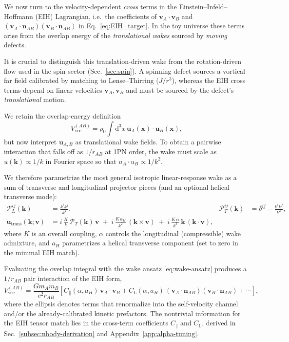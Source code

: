\documentclass[11pt]{article}
\newcommand{\dd}{\mathrm{d}}
\begin{document}
We now turn to the velocity-dependent \emph{cross} terms in the
Einstein--Infeld--Hoffmann (EIH) Lagrangian, i.e.\ the coefficients of
$\mathbf{v}_A\!\cdot\!\mathbf{v}_B$ and
$(\mathbf{v}_A\!\cdot\!\mathbf{n}_{AB})(\mathbf{v}_B\!\cdot\!\mathbf{n}_{AB})$
in Eq.~\eqref{eq:EIH_target}.
In the toy universe these terms arise from the overlap energy of the
\emph{translational wakes} sourced by \emph{moving} defects.

It is crucial to distinguish this translation-driven wake from the
rotation-driven flow used in the spin sector (Sec.~\ref{sec:spin}).
A spinning defect sources a vortical far field calibrated by matching to
Lense--Thirring ($J/r^3$), whereas the EIH cross terms depend on linear
velocities $\mathbf{v}_A,\mathbf{v}_B$ and must be sourced by the defect's
\emph{translational} motion.

We retain the overlap-energy definition
\begin{equation}
  V_{\text{vec}}^{(AB)}
  = \rho_0 \int \dd^3 x\,
    \mathbf{u}_A(\mathbf{x})\cdot\mathbf{u}_B(\mathbf{x}),
  \label{eq:Vvec-overlap}
\end{equation}
but now interpret $\mathbf{u}_{A,B}$ as translational wake fields.
To obtain a pairwise interaction that falls off as $1/r_{AB}$ at 1PN order,
the wake must scale as $u(\mathbf{k})\propto 1/k$ in Fourier space so that
$u_A\cdot u_B\propto 1/k^2$.

We therefore parametrize the most general isotropic linear-response wake as a
sum of transverse and longitudinal projector pieces (and an optional helical
transverse mode):
\begin{align}
  \mathcal{P}_L^{ij}(\mathbf{k}) &= \frac{k^i k^j}{k^2},
  &
  \mathcal{P}_T^{ij}(\mathbf{k}) &= \delta^{ij} - \frac{k^i k^j}{k^2},
  \\
  \mathbf{u}_{\text{trans}}(\mathbf{k};\mathbf{v})
  &=
  i\,\frac{K}{k}\,\mathcal{P}_T(\mathbf{k})\,\mathbf{v}
  \;+\;
  i\,\frac{K\,a_H}{k^2}\,(\mathbf{k}\times \mathbf{v})
  \;+\;
  i\,\frac{K\,\alpha}{k^3}\,\mathbf{k}\,(\mathbf{k}\cdot\mathbf{v}),
  \label{eq:wake-ansatz}
\end{align}
where $K$ is an overall coupling, $\alpha$ controls the longitudinal
(compressible) wake admixture, and $a_H$ parametrizes a helical transverse
component (set to zero in the minimal EIH match).

Evaluating the overlap integral with the wake ansatz
\eqref{eq:wake-ansatz} produces a $1/r_{AB}$ pair interaction of the EIH form,
\begin{equation}
  V_{\text{vec}}^{(AB)}
  = \frac{G m_A m_B}{c^2 r_{AB}}
    \left[
      C_\parallel(\alpha,a_H)\,
      \mathbf{v}_A\cdot\mathbf{v}_B
      + C_{\text{L}}(\alpha,a_H)\,
      (\mathbf{v}_A\cdot\mathbf{n}_{AB})
      (\mathbf{v}_B\cdot\mathbf{n}_{AB})
      + \cdots
    \right],
  \label{eq:Vvec-general}
\end{equation}
where the ellipsis denotes terms that renormalize into the self-velocity
channel and/or the already-calibrated kinetic prefactors.
The nontrivial information for the EIH tensor match lies in the cross-term
coefficients $C_\parallel$ and $C_{\text{L}}$, derived in
Sec.~\ref{subsec:nbody-derivation} and Appendix~\ref{app:alpha-tuning}.
\end{document}
